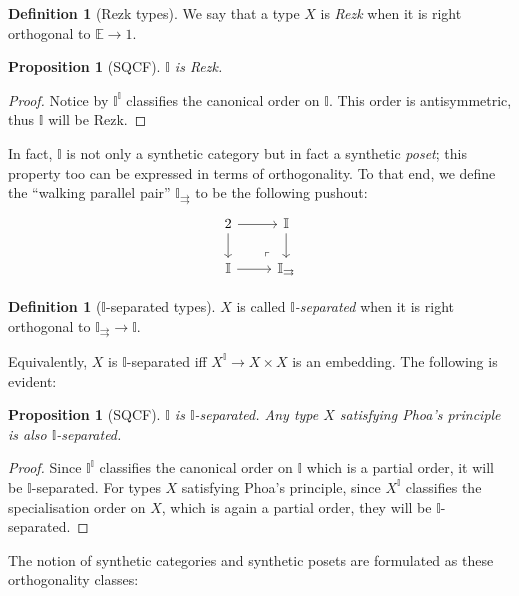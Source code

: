 \documentclass[12pt]{amsart}
\newtheorem{proposition}[theorem]{Proposition}
\theoremstyle{definition}
\newtheorem{definition}[theorem]{Definition}
\newcommand{\mbb}[1]{\mathbb{#1}}
\newcommand{\I}{\mbb I}
\begin{document}
\begin{definition}[Rezk types]
  We say that a type $X$ is \emph{Rezk} when it is right orthogonal to $\mbb E \to 1$.
\end{definition}

\begin{proposition}[SQCF]
  $\I$ is Rezk.
\end{proposition}
\begin{proof}
  Notice by  $\I^\I$ classifies the canonical order on $\I$. This order is antisymmetric, thus $\I$ will be Rezk.
\end{proof}

In fact, $\I$ is not only a synthetic category but in fact a synthetic \emph{poset}; this property too can be expressed in terms of orthogonality. To that end, we define the ``walking parallel pair'' $\I_{\rightrightarrows}$ to be the following pushout:
\[
\begin{tikzcd}
  2 \ar[r] \ar[d] & \I \ar[d] \\ 
  \I \ar[r] & \I_{\rightrightarrows}
  \arrow["\lrcorner"{anchor=center, pos=0.125, rotate=180}, draw=none, from=2-2, to=1-1]
\end{tikzcd}
\]

\begin{definition}[$\I$-separated types]
  $X$ is called \emph{$\I$-separated} when it is right orthogonal to $\I_{\rightrightarrows} \to \I$.
\end{definition}

Equivalently, $X$ is $\I$-separated iff $X^\I \to X \times X$ is an embedding. The following is evident:

\begin{proposition}[SQCF]
  $\I$ is $\I$-separated. Any type $X$ satisfying Phoa's principle is also $\I$-separated.
\end{proposition}
\begin{proof}
  Since $\I^\I$ classifies the canonical order on $\I$ which is a partial order, it will be $\I$-separated. For types $X$ satisfying Phoa's principle, since $X^\I$ classifies the specialisation order on $X$, which is again a partial order, they will be $\I$-separated.
\end{proof}

The notion of synthetic categories and synthetic posets are formulated as these orthogonality classes:

\end{document}
